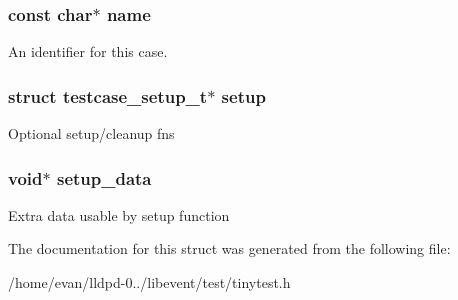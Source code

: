 \subsubsection[{name}]{\setlength{\rightskip}{0pt plus 5cm}const char$\ast$ {\bf name}}\label{structtestcase__t_a8f8f80d37794cde9472343e4487ba3eb}
\-An identifier for this case. 
\subsubsection[{setup}]{\setlength{\rightskip}{0pt plus 5cm}struct {\bf testcase\-\_\-setup\-\_\-t}$\ast$ {\bf setup}}\label{structtestcase__t_a590006194548bb6cf9aa8b4f3a098d57}
\-Optional setup/cleanup fns 
\subsubsection[{setup\-\_\-data}]{\setlength{\rightskip}{0pt plus 5cm}void$\ast$ {\bf setup\-\_\-data}}\label{structtestcase__t_a8582fb63aecd1164735afff1366a6c3c}
\-Extra data usable by setup function 

\-The documentation for this struct was generated from the following file\-:\begin{DoxyCompactItemize}
\item 
/home/evan/lldpd-\/0../libevent/test/tinytest.\-h\end{DoxyCompactItemize}
